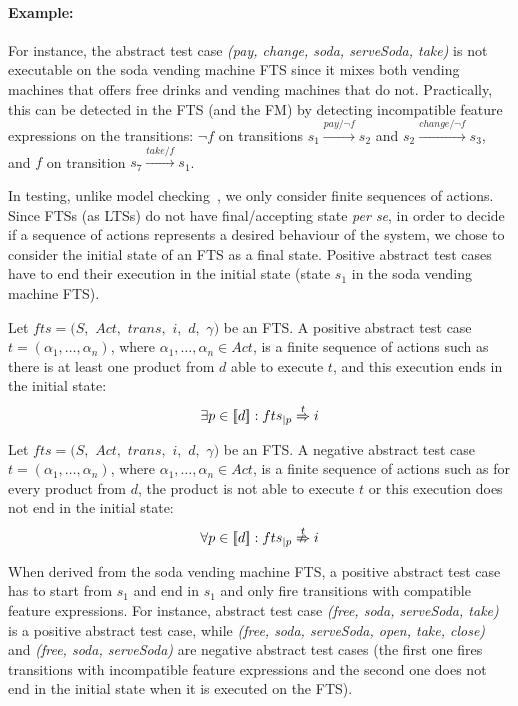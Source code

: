 \paragraph{Example:} 

For instance, the abstract test case \textit{(pay, change, soda, serve\-Soda, take)} is not executable on the soda vending machine FTS since it mixes both vending machines that offers free drinks and vending machines that do not. Practically, this can be detected in the FTS (and the FM) by detecting incompatible feature expressions on the transitions: $\neg f$ on transitions $s_1 \xrightarrow{pay/\neg f} s_2$ and $s_2 \xrightarrow{change/\neg f} s_3$, and $f$ on transition $s_7 \xrightarrow{take/f} s_1$.

In testing, unlike model checking~\cite{Baier2008}, we only consider finite sequences of actions. Since FTSs (as LTSs) do not have final/accepting state \textit{per se}, in order to decide if a sequence of actions represents a desired behaviour of the system, we chose to consider the initial state of an FTS as a final state. Positive abstract test cases have to end their execution in the initial state (\eg state $s_1$ in the soda vending machine FTS).

\begin{definition} \label{def:postc}
Let $fts=(S,$ $Act,$ $trans,$ $i,$ $d,$ $\gamma)$ be an FTS. A positive abstract test case $t=(\alpha_1,\ldots, \alpha_n)$, where $\alpha_1,\ldots, \alpha_n \in Act$, is a finite sequence of actions such as there is at least one product from $d$ able to execute $t$, and this execution ends in the initial state:
$$\exists p \in [\![ d]\!] : fts_{\mid p} \overset{t}{\Rightarrow} i$$
\end{definition}

\begin{definition} \label{def:negtc}
Let $fts=(S,$ $Act,$ $trans,$ $i,$ $d,$ $\gamma)$ be an FTS. A negative abstract test case $t=(\alpha_1,\ldots, \alpha_n)$, where $\alpha_1,\ldots, \alpha_n \in Act$, is a finite sequence of actions such as for every product from $d$, the product is not able to execute $t$ or this execution does not end in the initial state:
$$\forall p \in [\![ d]\!] : fts_{\mid p} \overset{t}{\nRightarrow} i$$
\end{definition} 

When derived from the soda vending machine FTS, a positive abstract test case has to start from $s_1$ and end in $s_1$ and only fire transitions with compatible feature expressions. For instance, abstract test case \textit{(free, soda, serve\-Soda, take)} is a positive abstract test case, while \textit{(free, soda, serve\-Soda, open, take, close)} and \textit{(free, soda, serve\-Soda)} are negative abstract test cases (the first one fires transitions with incompatible feature expressions and the second one does not end in the initial state when it is executed on the FTS).

